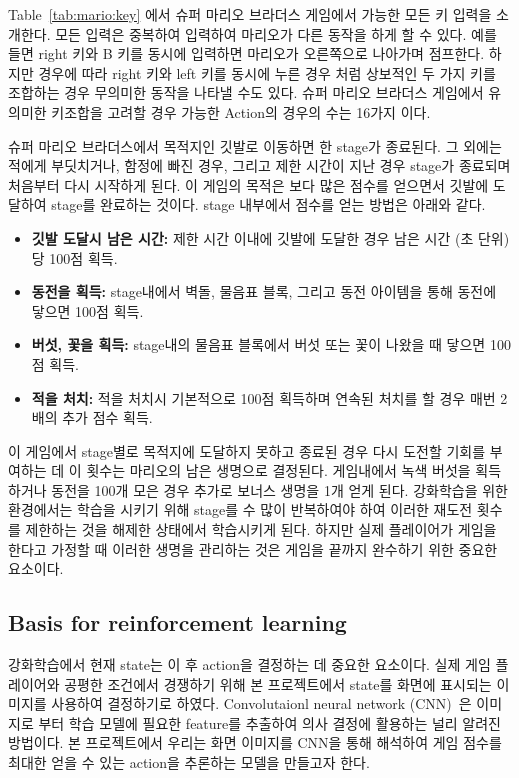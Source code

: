 Table~\ref{tab:mario:key} 에서 슈퍼 마리오 브라더스 게임에서 가능한 모든 키 입력을 소개한다.
모든 입력은 중복하여 입력하여 마리오가 다른 동작을 하게 할 수 있다.
예를 들면 right 키와 B 키를 동시에 입력하면 마리오가 오른쪽으로 나아가며 점프한다.
하지만 경우에 따라 right 키와 left 키를 동시에 누른 경우 처럼 상보적인 두 가지 키를 조합하는 경우 무의미한 동작을 나타낼 수도 있다.
슈퍼 마리오 브라더스 게임에서 유의미한 키조합을 고려할 경우 가능한 Action의 경우의 수는 16가지 이다.

슈퍼 마리오 브라더스에서 목적지인 깃발로 이동하면 한 stage가 종료된다.
그 외에는 적에게 부딧치거나, 함정에 빠진 경우, 그리고 제한 시간이 지난 경우 stage가 종료되며 처음부터 다시 시작하게 된다.
이 게임의 목적은 보다 많은 점수를 얻으면서 깃발에 도달하여 stage를 완료하는 것이다.
stage 내부에서 점수를 얻는 방법은 아래와 같다.
\begin{itemize}
	\item \textbf{깃발 도달시 남은 시간:}
		제한 시간 이내에 깃발에 도달한 경우 남은 시간 (초 단위)당 100점 획득.
	\item \textbf{동전을 획득:}
		stage내에서 벽돌, 물음표 블록, 그리고 동전 아이템을 통해 동전에 닿으면 100점 획득.
	\item \textbf{버섯, 꽃을 획득:}
		stage내의 물음표 블록에서 버섯 또는 꽃이 나왔을 때 닿으면 100점 획득.
	\item \textbf{적을 처치:}
		적을 처치시 기본적으로 100점 획득하며 연속된 처치를 할 경우 매번 2배의 추가 점수 획득.
\end{itemize}

이 게임에서 stage별로 목적지에 도달하지 못하고 종료된 경우 다시 도전할 기회를 부여하는 데 이 횟수는 마리오의 남은 생명으로 결정된다.
게임내에서 녹색 버섯을 획득하거나 동전을 100개 모은 경우 추가로 보너스 생명을 1개 얻게 된다.
강화학습을 위한 환경에서는 학습을 시키기 위해 stage를 수 많이 반복하여야 하여 이러한 재도전 횟수를 제한하는 것을 해제한 상태에서 학습시키게 된다.
하지만 실제 플레이어가 게임을 한다고 가정할 때 이러한 생명을 관리하는 것은 게임을 끝까지 완수하기 위한 중요한 요소이다.

\subsection{Basis for reinforcement learning}
강화학습에서 현재 state는 이 후 action을 결정하는 데 중요한 요소이다.
실제 게임 플레이어와 공평한 조건에서 경쟁하기 위해 본 프로젝트에서 state를 화면에 표시되는 이미지를 사용하여 결정하기로 하였다.
Convolutaionl neural network (CNN)~\cite{CNN}은 이미지로 부터 학습 모델에 필요한 feature를 추출하여 의사 결정에 활용하는 널리 알려진 방법이다.
본 프로젝트에서 우리는 화면 이미지를 CNN을 통해 해석하여 게임 점수를 최대한 얻을 수 있는 action을 추론하는 모델을 만들고자 한다.

